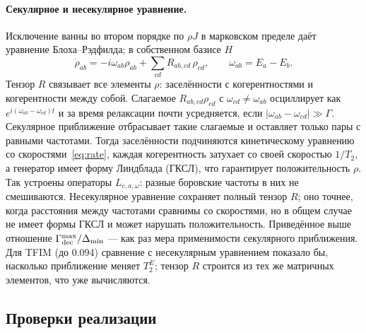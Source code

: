 \documentclass[12pt,a4paper]{article}
\newcommand{\rhoJ}{\rho J}
\newcommand{\kT}{k_BT}
\begin{document}
\paragraph{Секулярное и несекулярное уравнение.} Исключение ванны во втором порядке по $\rhoJ$ в
марковском пределе даёт уравнение Блоха--Рэдфилда; в собственном базисе $H$
\begin{equation}
\dot\rho_{ab}=-i\omega_{ab}\rho_{ab}+\sum_{cd}R_{ab,cd}\,\rho_{cd},\qquad \omega_{ab}=E_a-E_b .
\end{equation}
Тензор $R$ связывает все элементы $\rho$: заселённости с когерентностями и когерентности между собой.
Слагаемое $R_{ab,cd}\rho_{cd}$ с $\omega_{cd}\ne\omega_{ab}$ осциллирует как $e^{i(\omega_{ab}-\omega_{cd})t}$ и за
время релаксации почти усредняется, если $|\omega_{ab}-\omega_{cd}|\gg\Gamma$. Секулярное приближение
отбрасывает такие слагаемые и оставляет только пары с равными частотами. Тогда заселённости подчиняются
кинетическому уравнению со скоростями~\eqref{eq:rate}, каждая когерентность затухает со своей
скоростью $1/T_2$, а генератор имеет форму Линдблада (ГКСЛ), что гарантирует положительность $\rho$.
Так устроены операторы $L_{c,a,\omega}$: разные боровские частоты в них не смешиваются.
Несекулярное уравнение сохраняет полный тензор $R$; оно точнее, когда расстояния между частотами
сравнимы со скоростями, но в общем случае не имеет формы ГКСЛ и может нарушать положительность.
Приведённое выше отношение $\Gamma_{\rm dec}^{\max}/\Delta_{\min}$ --- как раз мера применимости
секулярного приближения. Для TFIM (до 0.094) сравнение с несекулярным уравнением показало бы, насколько
приближение меняет $T_2^E$; тензор $R$ строится из тех же матричных элементов, что уже вычисляются.

\begin{table}[h]
\centering\small

\caption{Проверка параметров $\rhoJ=0.1$, $\kT=0.2$, $J=0.8$ по сетке п.~\ref{sec:demo}. $\Gamma_{\rm tr}^{\max}$ ---
наибольшая скорость перехода между собственными состояниями, $\Gamma_{\rm dec}^{\max}$ --- наибольшая
скорость затухания, $\Delta_{\min}$ --- наименьшее ненулевое расстояние между различными боровскими частотами.}
\label{tab:validity}
\end{table}

\subsection{Проверки реализации}
\end{document}
